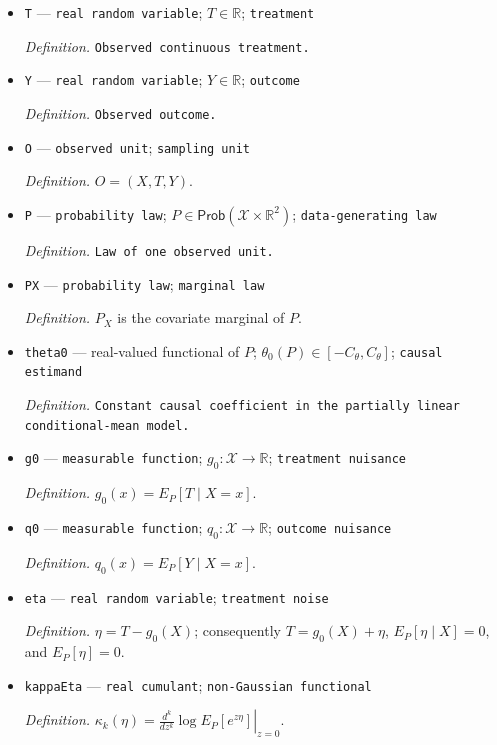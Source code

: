 \documentclass{article}
\begin{document}
\begin{itemize}
  \item \texttt{T} --- \texttt{real random variable}; \(T\in\mathbb R\); \texttt{treatment}
  \par\smallskip\noindent\emph{Definition.} \texttt{Observed continuous treatment.}
  \item \texttt{Y} --- \texttt{real random variable}; \(Y\in\mathbb R\); \texttt{outcome}
  \par\smallskip\noindent\emph{Definition.} \texttt{Observed outcome.}
  \item \texttt{O} --- \texttt{observed unit}; \texttt{sampling unit}
  \par\smallskip\noindent\emph{Definition.} \(O=(X,T,Y)\).
  \item \texttt{P} --- \texttt{probability law}; \(P\in\mathsf{Prob}(\mathcal X\times\mathbb R^2)\); \texttt{data-\allowbreak{}generating law}
  \par\smallskip\noindent\emph{Definition.} \texttt{Law of one observed unit.}
  \item \texttt{PX} --- \texttt{probability law}; \texttt{marginal law}
  \par\smallskip\noindent\emph{Definition.} \(P_X\) is the covariate marginal of \(P\).
  \item \texttt{theta0} --- real-valued functional of \(P\); \(\theta_0(P)\in[-C_{\theta},C_{\theta}]\); \texttt{causal estimand}
  \par\smallskip\noindent\emph{Definition.} \texttt{Constant causal coefficient in the partially linear conditional-\allowbreak{}mean model.}
  \item \texttt{g0} --- \texttt{measurable function}; \(g_0:\mathcal X\to\mathbb R\); \texttt{treatment nuisance}
  \par\smallskip\noindent\emph{Definition.} \(g_0(x)=E_P[T\mid X=x]\).
  \item \texttt{q0} --- \texttt{measurable function}; \(q_0:\mathcal X\to\mathbb R\); \texttt{outcome nuisance}
  \par\smallskip\noindent\emph{Definition.} \(q_0(x)=E_P[Y\mid X=x]\).
  \item \texttt{eta} --- \texttt{real random variable}; \texttt{treatment noise}
  \par\smallskip\noindent\emph{Definition.} \(\eta=T-g_0(X)\); consequently \(T=g_0(X)+\eta\), \(E_P[\eta\mid X]=0\), and \(E_P[\eta]=0\).
  \item \texttt{kappaEta} --- \texttt{real cumulant}; \texttt{non-\allowbreak{}Gaussian functional}
  \par\smallskip\noindent\emph{Definition.} \(\kappa_k(\eta)=\left.\frac{d^k}{dz^k}\log E_P[e^{z\eta}]\right|_{z=0}\).

\end{itemize}
\end{document}
